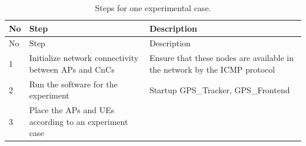 \begin{longtable}[]{@{}lll@{}}
\caption{Steps for one experimental case.}\tabularnewline
\toprule
\begin{minipage}[b]{0.01\columnwidth}\raggedright
No\strut
\end{minipage} & \begin{minipage}[b]{0.35\columnwidth}\raggedright
Step\strut
\end{minipage} & \begin{minipage}[b]{0.55\columnwidth}\raggedright
Description\strut
\end{minipage}\tabularnewline
\midrule
\endfirsthead
\toprule
\begin{minipage}[b]{0.01\columnwidth}\raggedright
No\strut
\end{minipage} & \begin{minipage}[b]{0.35\columnwidth}\raggedright
Step\strut
\end{minipage} & \begin{minipage}[b]{0.55\columnwidth}\raggedright
Description\strut
\end{minipage}\tabularnewline
\midrule
\endhead
\begin{minipage}[t]{0.01\columnwidth}\raggedright
1\strut
\end{minipage} & \begin{minipage}[t]{0.35\columnwidth}\raggedright
Initialize network connectivity between APs and CnCs\strut
\end{minipage} & \begin{minipage}[t]{0.55\columnwidth}\raggedright
Ensure that these nodes are available in the network by the ICMP
protocol\strut
\end{minipage}\tabularnewline
\begin{minipage}[t]{0.01\columnwidth}\raggedright
2\strut
\end{minipage} & \begin{minipage}[t]{0.35\columnwidth}\raggedright
Run the software for the experiment\strut
\end{minipage} & \begin{minipage}[t]{0.55\columnwidth}\raggedright
Startup GPS\_Tracker, GPS\_Frontend\strut
\end{minipage}\tabularnewline
\begin{minipage}[t]{0.01\columnwidth}\raggedright
3\strut
\end{minipage} & \begin{minipage}[t]{0.35\columnwidth}\raggedright
Place the APs and UEs according to an experiment case\strut

\end{minipage}
\end{longtable}
